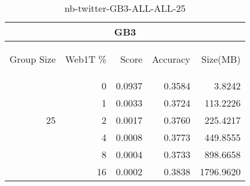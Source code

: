 \begin{center}
\begin{table}[htbp]
\begin{tabular}{ | r | r | r | r | r |}
\hline
\multicolumn{5}{|c|}{GB3}\\
\hline
\begin{sideways}Group Size\end{sideways} & \begin{sideways}Web1T \%\end{sideways} & \begin{sideways}Score\end{sideways} & \begin{sideways}Accuracy\end{sideways} & \begin{sideways}Size(MB)\end{sideways}\\
\hline
\multirow{5}{*}{25}
 & 0 & 0.0937 & 0.3584 & 3.8242\\ \cline{2-5}
 & 1 & 0.0033 & 0.3724 & 113.2226\\ \cline{2-5}
 & 2 & 0.0017 & 0.3760 & 225.4217\\ \cline{2-5}
 & 4 & 0.0008 & 0.3773 & 449.8555\\ \cline{2-5}
 & 8 & 0.0004 & 0.3733 & 898.6658\\ \cline{2-5}
 & 16 & 0.0002 & 0.3838 & 1796.9620\\ \cline{2-5}
\hline
\end{tabular}
\caption{nb-twitter-GB3-ALL-ALL-25}
\label{table:nb-twitter-GB3-ALL-ALL-25}
\end{table}
\end{center}

